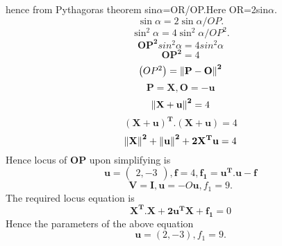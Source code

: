 \documentclass[10pt, a4paper]{article}
\newcommand{\myvec}[1]{\ensuremath{\begin{pmatrix}#1\end{pmatrix}}}
\let\vec\mathbf
\begin{document}
hence from Pythagoras theorem sin$\alpha$=OR/OP.Here OR=2sin$\alpha$.\\
\begin{equation}
\sin\alpha=2\sin\alpha/OP.
\end{equation}
\begin{equation}
    \sin^2\alpha=4\sin^2\alpha/OP^2.
\end{equation}
\begin{equation}
\vec{OP^2} sin^2\alpha=4sin^2\alpha
\end{equation}
\begin{equation}
   \vec{OP^2}=4
\end{equation}
\begin{equation}
    \myvec{OP^2}=\vec{\norm{P-O}^2}
\end{equation}
\begin{equation}
\vec{P}=\vec{X},\vec{O}=-\vec{u}
\end{equation}
\begin{equation}
    \vec{\norm{X+u}^2}=4
\end{equation}
\begin{equation}
\vec{(X+u)^T.(X+u)}=4
\end{equation}
\begin{equation}
\vec{\norm{X}^2+\norm{u}^2+2X^Tu}=4
\end{equation}
Hence locus of $\vec{OP}$  upon simplifying is
\begin{equation}
\vec{u}=\myvec{2,-3},\vec{f}=4,\vec{f_1}=\vec{u^T.u-f}
\end{equation}
\begin{equation}
\vec{V}=\vec{I},\vec{u}=-O\vec{u},f_1=9.
\end{equation}
The required locus equation is 
\begin{equation}
\vec{X^T.X+2\vec{u^T}\vec{X}+f_1}=0
\label{eq-5}
\end{equation}
Hence the parameters of the above equation
\begin{equation}
\vec{u}=(2,-3),f_1=9.
\end{equation}
\end{document}
